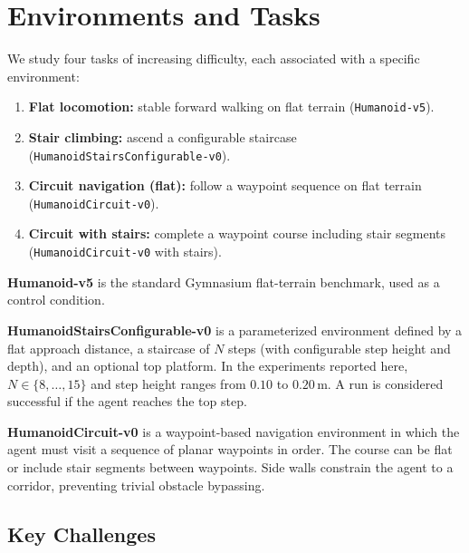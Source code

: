 \documentclass[conference]{IEEEtran}
\begin{document}
\section{Environments and Tasks}
\label{sec:environments}

We study four tasks of increasing difficulty, each associated with a specific environment:

\begin{enumerate}
    \item \textbf{Flat locomotion:} stable forward walking on flat terrain (\texttt{Humanoid-v5}).
    \item \textbf{Stair climbing:} ascend a configurable staircase (\texttt{HumanoidStairsConfigurable-v0}).
    \item \textbf{Circuit navigation (flat):} follow a waypoint sequence on flat terrain (\texttt{HumanoidCircuit-v0}).
    \item \textbf{Circuit with stairs:} complete a waypoint course including stair segments (\texttt{HumanoidCircuit-v0} with stairs).
\end{enumerate}

\textbf{Humanoid-v5} is the standard Gymnasium flat-terrain benchmark, used as a control condition.

\textbf{HumanoidStairsConfigurable-v0} is a parameterized environment defined by a flat approach distance, a staircase of $N$ steps (with configurable step height and depth), and an optional top platform. In the experiments reported here, $N \in \{8, \dots, 15\}$ and step height ranges from $0.10$ to $0.20\,$m. A run is considered successful if the agent reaches the top step.

\textbf{HumanoidCircuit-v0} is a waypoint-based navigation environment in which the agent must visit a sequence of planar waypoints in order. The course can be flat or include stair segments between waypoints. Side walls constrain the agent to a corridor, preventing trivial obstacle bypassing.

\subsection{Key Challenges}
\end{document}
